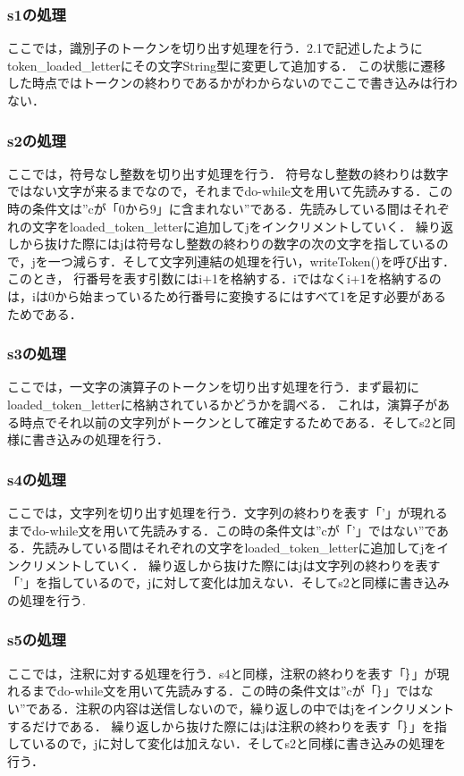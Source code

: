 \documentclass[dvipdfmx]{jarticle}
\begin{document}
\subsubsection{s1の処理}
ここでは，識別子のトークンを切り出す処理を行う．2.1で記述したようにtoken\_loaded\_letterにその文字String型に変更して追加する．
この状態に遷移した時点ではトークンの終わりであるかがわからないのでここで書き込みは行わない．
\subsubsection{s2の処理}
ここでは，符号なし整数を切り出す処理を行う．
符号なし整数の終わりは数字ではない文字が来るまでなので，それまでdo-while文を用いて先読みする．この時の条件文は”cが「0から9」に含まれない”である．先読みしている間はそれぞれの文字をloaded\_token\_letterに追加してjをインクリメントしていく．
繰り返しから抜けた際にはjは符号なし整数の終わりの数字の次の文字を指しているので，jを一つ減らす．そして文字列連結の処理を行い，writeToken()を呼び出す．このとき，
行番号を表す引数にはi+1を格納する．iではなくi+1を格納するのは，iは0から始まっているため行番号に変換するにはすべて1を足す必要があるためである．
\subsubsection{s3の処理}
ここでは，一文字の演算子のトークンを切り出す処理を行う．まず最初にloaded\_token\_letterに格納されているかどうかを調べる．
これは，演算子がある時点でそれ以前の文字列がトークンとして確定するためである．そしてs2と同様に書き込みの処理を行う．
\subsubsection{s4の処理}
ここでは，文字列を切り出す処理を行う．文字列の終わりを表す「’」が現れるまでdo-while文を用いて先読みする．この時の条件文は”cが「’」ではない”である．先読みしている間はそれぞれの文字をloaded\_token\_letterに追加してjをインクリメントしていく．
繰り返しから抜けた際にはjは文字列の終わりを表す「’」を指しているので，jに対して変化は加えない．そしてs2と同様に書き込みの処理を行う.
\subsubsection{s5の処理}
ここでは，注釈に対する処理を行う．s4と同様，注釈の終わりを表す「｝」が現れるまでdo-while文を用いて先読みする．この時の条件文は”cが「｝」ではない”である．注釈の内容は送信しないので，繰り返しの中ではjをインクリメントするだけである．
繰り返しから抜けた際にはjは注釈の終わりを表す「｝」を指しているので，jに対して変化は加えない．そしてs2と同様に書き込みの処理を行う．
\end{document}

